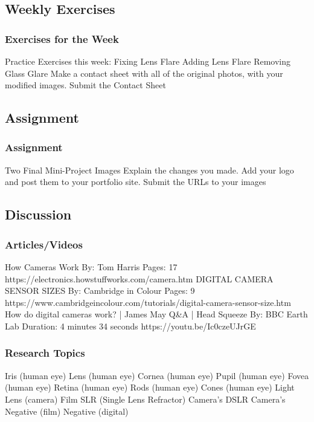 \documentclass{beamer}
\begin{document}
\subsection{Weekly Exercises}		
\begin{frame}
	\frametitle{Exercises for the Week}
	\begin{outline}
		\1 Practice Exercises this week:  
		\2 Fixing Lens Flare
		\2 Adding Lens Flare
		\2 Removing Glass Glare
		\1 Make a contact sheet with all of the original photos, with your modified images.
		\1 Submit the Contact Sheet
	\end{outline}
\end{frame}

\subsection{Assignment}		
\begin{frame}
	\frametitle{ Assignment}
	\begin{outline}
		\1 Two Final Mini-Project Images
		\2 Explain the changes you made.
		\2 Add your logo and post them to your portfolio site.
		\2 Submit the URLs to your images
	\end{outline}
\end{frame}

\subsection{Discussion}		
\begin{frame}
	\frametitle{Articles/Videos}
	\begin{outline}
		\1 How Cameras Work
		\2  By:  Tom Harris
		\2  Pages:  17
		\2 https://electronics.howstuffworks.com/camera.htm
		\1 DIGITAL CAMERA SENSOR SIZES
		\2  By:  Cambridge in Colour
		\2  Pages:  9
		\2  https://www.cambridgeincolour.com/tutorials/digital-camera-sensor-size.htm
		\1 How do digital cameras work? | James May Q\&A | Head Squeeze
		\2  By:  BBC Earth Lab
		\2  Duration:  4 minutes 34 seconds
		\2 https://youtu.be/Ic0czeUJrGE
	\end{outline}
\end{frame}

\begin{frame}
	\frametitle{Research Topics}
	\begin{outline}
		\1 Iris (human eye)
		\1 Lens (human eye)
		\1 Cornea (human eye)
		\1 Pupil (human eye)
		\1 Fovea (human eye)
		\1 Retina (human eye)
		\1 Rods (human eye)
		\1 Cones (human eye)
		\1 Light
		\1 Lens (camera)
		\1 Film
		\1 SLR (Single Lens Refractor) Camera's
		\1 DSLR Camera's
		\1 Negative (film)
		\1 Negative (digital)
	\end{outline}
\end{frame}
	
			
\end{document}
